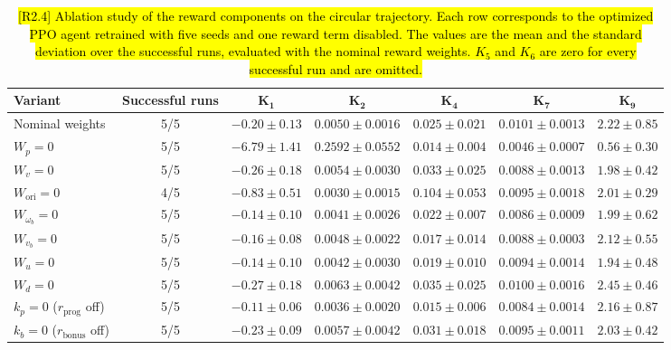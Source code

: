 \documentclass{ieeeaccess}
\newcommand{\hlone}[1]{{\sethlcolor{rone}\hl{#1}}}
\begin{document}
\begin{table}[t]
    \centering
    \caption{\hlone{[R2.4] Ablation study of the reward components on the circular trajectory. Each row corresponds to the
    optimized PPO agent retrained with five seeds and one reward term disabled. The values are the mean and the
    standard deviation over the successful runs, evaluated with the nominal reward weights. $K_5$ and $K_6$ are
    zero for every successful run and are omitted.}}
    \label{tab:reward_ablation}
    \renewcommand{\arraystretch}{1.05}
    \setlength{\tabcolsep}{6pt}
    \small
    \begin{tabular}{lcccccc}
        \toprule
        \textbf{Variant} & \textbf{Successful runs} & $\boldsymbol{K_1}$ & $\boldsymbol{K_2}$ &
          $\boldsymbol{K_4}$ & $\boldsymbol{K_7}$ & $\boldsymbol{K_9}$ \\
        \midrule
        Nominal weights & 5/5 & $-0.20 \pm 0.13$ & $0.0050 \pm 0.0016$ & $0.025 \pm 0.021$ &
          $0.0101 \pm 0.0013$ & $2.22 \pm 0.85$ \\
        $W_p = 0$ & 5/5 & $-6.79 \pm 1.41$ & $0.2592 \pm 0.0552$ & $0.014 \pm 0.004$ &
          $0.0046 \pm 0.0007$ & $0.56 \pm 0.30$ \\
        $W_v = 0$ & 5/5 & $-0.26 \pm 0.18$ & $0.0054 \pm 0.0030$ & $0.033 \pm 0.025$ &
          $0.0088 \pm 0.0013$ & $1.98 \pm 0.42$ \\
        $W_{\mathrm{ori}} = 0$ & 4/5 & $-0.83 \pm 0.51$ & $0.0030 \pm 0.0015$ & $0.104 \pm 0.053$ &
          $0.0095 \pm 0.0018$ & $2.01 \pm 0.29$ \\
        $W_{\omega_b} = 0$ & 5/5 & $-0.14 \pm 0.10$ & $0.0041 \pm 0.0026$ & $0.022 \pm 0.007$ &
          $0.0086 \pm 0.0009$ & $1.99 \pm 0.62$ \\
        $W_{v_b} = 0$ & 5/5 & $-0.16 \pm 0.08$ & $0.0048 \pm 0.0022$ & $0.017 \pm 0.014$ &
          $0.0088 \pm 0.0003$ & $2.12 \pm 0.55$ \\
        $W_u = 0$ & 5/5 & $-0.14 \pm 0.10$ & $0.0042 \pm 0.0030$ & $0.019 \pm 0.010$ &
          $0.0094 \pm 0.0014$ & $1.94 \pm 0.48$ \\
        $W_d = 0$ & 5/5 & $-0.27 \pm 0.18$ & $0.0063 \pm 0.0042$ & $0.035 \pm 0.025$ &
          $0.0100 \pm 0.0016$ & $2.45 \pm 0.46$ \\
        $k_p = 0$ ($r_{\mathrm{prog}}$ off) & 5/5 & $-0.11 \pm 0.06$ & $0.0036 \pm 0.0020$ &
          $0.015 \pm 0.006$ & $0.0084 \pm 0.0014$ & $2.16 \pm 0.87$ \\
        $k_b = 0$ ($r_{\mathrm{bonus}}$ off) & 5/5 & $-0.23 \pm 0.09$ & $0.0057 \pm 0.0042$ &
          $0.031 \pm 0.018$ & $0.0095 \pm 0.0011$ & $2.03 \pm 0.42$ \\
        \bottomrule
    \end{tabular}
\end{table}
\end{document}
